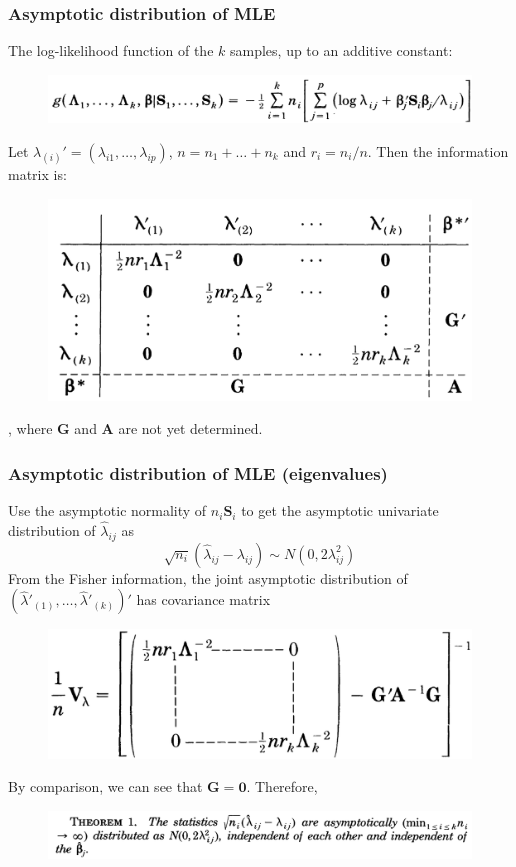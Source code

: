 \documentclass{beamer}
\begin{document}
\begin{frame}
	\frametitle{Asymptotic distribution of MLE}
	The log-likelihood function of the $k$ samples, up to an additive constant:
	\begin{figure}
		\includegraphics[width=0.8\linewidth]{image001.png}
	\end{figure}
Let $\lambda_{(i)}' = (\lambda_{i1},\ldots,\lambda_{ip})$, $n = n_1+\ldots+n_k$ and $r_i = n_i/n$. Then the information matrix is:
\begin{figure}
	\includegraphics[width=0.6\linewidth]{image002.png}
\end{figure}	
	, where $\bm{G}$ and $\bm{A}$ are not yet determined.
\end{frame}

\begin{frame}
	\frametitle{Asymptotic distribution of MLE (eigenvalues)}
	Use the asymptotic normality of $n_i\bm{S}_i$ to get the asymptotic univariate distribution of $\hat{\lambda}_{ij}$ as
	$$\sqrt{n_i}(\hat{\lambda}_{ij} - \lambda_{ij}) \sim N(0, 2\lambda_{ij}^2)$$
	From the Fisher information, the joint asymptotic distribution of $(\hat{\lambda}'_{(1)},\ldots,\hat{\lambda}'_{(k)})'$ has covariance matrix
	\begin{figure}
		\includegraphics[width=0.6\linewidth]{image003.png}
	\end{figure}
By comparison, we can see that $\bm{G} = \bm{0}$. Therefore,
	\begin{figure}
	\includegraphics[width=0.9\linewidth]{image004.png}
\end{figure} 
\end{frame}
	
\end{document}
